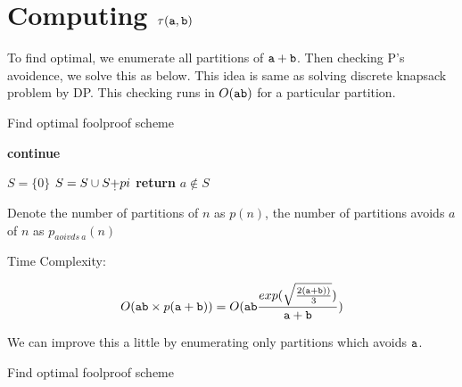 \section{Computing $\tau(\mathtt{a},\mathtt{b})$}
To find optimal, we enumerate all partitions of $\mathtt{a}+\mathtt{b}$.
Then checking P's avoidence, we solve this as below. This idea is same as solving discrete knapsack problem by DP. This checking runs in $O(\mathtt{a}\mathtt{b})$ for a particular partition.

\begin{algorithm}
\caption{Find optimal foolproof scheme}\label{alg:stupid}
\begin{algorithmic}
       \State \bf continue \EndIf
       
      \EndIf
    \EndFor
  \EndProcedure
  \end{algorithmic}
\begin{algorithmic}
    \State $S= \{0\}$
      \State $S=S\cup S\text{\d{+}}pi$
    \EndFor
    \State \textbf{return} $a\not\in S$
  \EndProcedure
\end{algorithmic}
\end{algorithm}

Denote the number of partitions of $n$ as $p(n)$, the number of partitions avoids $a$ of $n$ as $p_{aoivds\ a}(n)$

Time Complexity: 

\[
O(\mathtt{a}\mathtt{b}\times p(\mathtt{a}+\mathtt{b}))\\
=O(\mathtt{a}\mathtt{b}\frac{exp(\sqrt{\frac{2(\mathtt{a}+\mathtt{b}))}{3} } )}{\mathtt{a}+\mathtt{b}})
\]

We can improve this a little by enumerating only partitions which avoids $\mathtt{a}$.
\begin{algorithm}
\caption{Find optimal foolproof scheme}\label{alg:naive}
\begin{algorithmic}
       
      \EndIf
    \EndFor
  \EndProcedure
  \end{algorithmic}
\end{algorithm}

